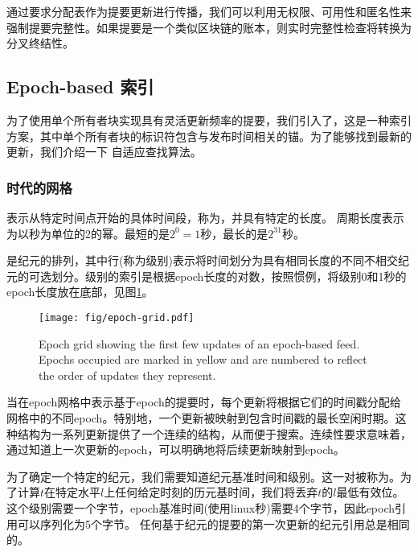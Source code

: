 通过要求分配表作为提要更新进行传播，我们可以利用无权限、可用性和匿名性来强制提要完整性。如果提要是一个类似区块链的账本，则实时完整性检查将转换为分叉终结性。 


\subsection{Epoch-based 
索引\statusyellow}\label{sec:epoch-based-feeds}

\yellow{}

为了使用单个所有者块实现具有灵活更新频率的提要，我们引入了，这是一种索引方案，其中单个所有者块的标识符包含与发布时间相关的锚。为了能够找到最新的更新，我们介绍一下
自适应查找算法。 

\subsubsection{时代的网格}

表示从特定时间点开始的具体时间段，称为，并具有特定的长度。  
周期长度表示为以秒为单位的2的幂。最短的是$2^0 = 1$秒，最长的是$2^{31}$秒。 

是纪元的排列，其中行(称为级别)表示将时间划分为具有相同长度的不同不相交纪元的可选划分。级别的索引是根据epoch长度的对数，按照惯例，将级别0和1秒的epoch长度放在底部，见图\ref{fig:epoch-grid}。

\begin{figure}[htbp]
\centering
\texttt{[image: fig/epoch-grid.pdf]}
\caption[Epoch grid with epoch-based feed updates\statusorange]{Epoch grid showing the first few updates of an epoch-based feed. Epochs occupied are marked in yellow and are numbered to reflect the order of updates they represent. }
\label{fig:epoch-grid}
\end{figure}

当在epoch网格中表示基于epoch的提要时，每个更新将根据它们的时间戳分配给网格中的不同epoch。特别地，一个更新被映射到包含时间戳的最长空闲时期。这种结构为一系列更新提供了一个连续的结构，从而便于搜索。连续性要求意味着，通过知道上一次更新的epoch，可以明确地将后续更新映射到epoch。


为了确定一个特定的纪元，我们需要知道纪元基准时间和级别。这一对被称为。为了计算$t$在特定水平$l$上任何给定时刻的历元基时间，我们将丢弃$t$的$l$最低有效位。 
这个级别需要一个字节，epoch基准时间(使用linux秒)需要4个字节，因此epoch引用可以序列化为5个字节。 
任何基于纪元的提要的第一次更新的纪元引用总是相同的。

